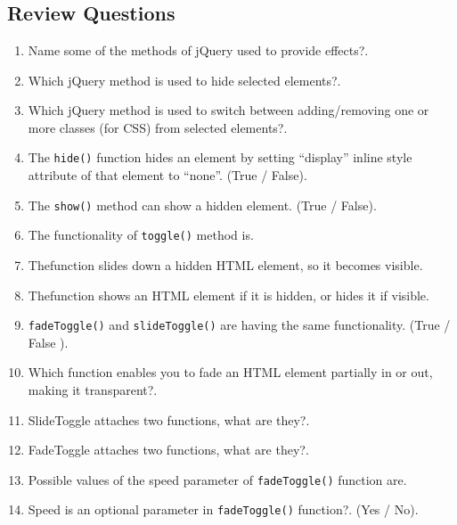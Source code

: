 \documentclass[11pt,a4paper]{article}
\begin{document}
\section*{}
\subsection*{Review Questions}
\begin{enumerate}\itemsep10pt
\item Name some of the methods of jQuery used to provide effects?\underline{\hspace{3cm}}.
\item Which jQuery method is used to hide selected elements?\underline{\hspace{3cm}}.
\item Which jQuery method is used to switch between adding/removing one or more classes (for CSS) from selected elements?\underline{\hspace{3cm}}.
\item The \texttt{hide()} function hides an element by setting “display” inline style attribute of that element to ``none''. (True / False)\underline{\hspace{3cm}}.
\item The \texttt{show()} method can show a hidden element. (True / False)\underline{\hspace{3cm}}.
\item The functionality of \texttt{toggle()} method is\underline{\hspace{3cm}}.
\item The\underline{\hspace{3cm}}function slides down a hidden HTML element, so it becomes visible.
\item The\underline{\hspace{3cm}}function shows an HTML element if it is hidden, or hides it if visible.
\item \texttt{fadeToggle()} and \texttt{slideToggle()} are having the same functionality. (True / False
)\underline{\hspace{3cm}}.
\item Which function enables you to fade an HTML element partially in or out, making it transparent?\underline{\hspace{3cm}}.
\item SlideToggle attaches two functions, what are they?\underline{\hspace{3cm}}.
\item FadeToggle attaches two functions, what are they?\underline{\hspace{3cm}}.
\item Possible values of the speed parameter of \texttt{fadeToggle()} function are\underline{\hspace{3cm}}.
\item Speed is an optional parameter in \texttt{fadeToggle()} function?. (Yes / No)\underline{\hspace{3cm}}.
\end{enumerate}
\end{document}
